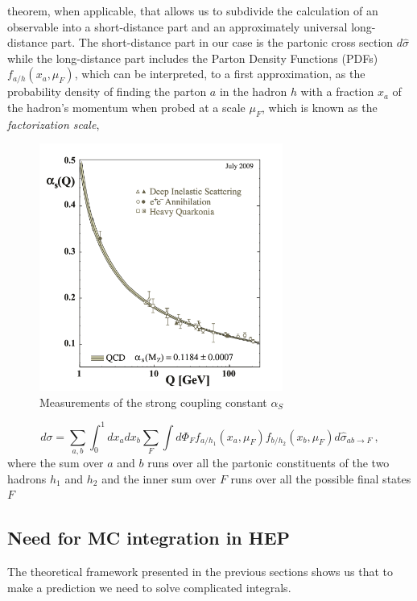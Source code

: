 \documentclass[../main/main.tex]{subfiles}
\begin{document}
 theorem, when 
applicable, that allows us to subdivide the calculation of an observable into a short-distance part and an approximately universal long-distance part.
The short-distance part in our case is the partonic cross section $d\hat{\sigma}$  while the long-distance part includes the Parton Density Functions (PDFs) $f_{a/h}(x_a,\mu_F)$, which can be interpreted, to a first approximation,  as the probability density of finding the parton $a$ in the hadron $h$ with a 
fraction $x_a$ of the hadron's  momentum when probed at a scale $\mu_F$, which is known as the \emph{factorization scale},
\begin{figure}[h]
	\centering
	\includegraphics[width=8cm]{../images/asymptotic_freedom.png}
	\caption{Measurements of the strong coupling constant $\alpha_S$}
	\label{alpha}
\end{figure}
\begin{equation}
	\label{QCD fact}
	d\sigma = \sum_{a,b}\int_0^1 dx_a dx_b \sum_F \int d\Phi_F f_{a/h_1}(x_a,\mu_F) f_{b/h_2}(x_b,\mu_F)  d\hat{\sigma}_{ab \rightarrow F} \ ,
\end{equation}
where the sum over $a$ and $b$ runs over all the partonic constituents of the two hadrons $h_1$ and $h_2$ and the inner sum over $F$ runs over all the possible final states $F$

\subsection{Need for MC integration in HEP}
The theoretical framework presented in the previous sections shows us that to make a prediction we need to solve complicated integrals. 
\end{document}

